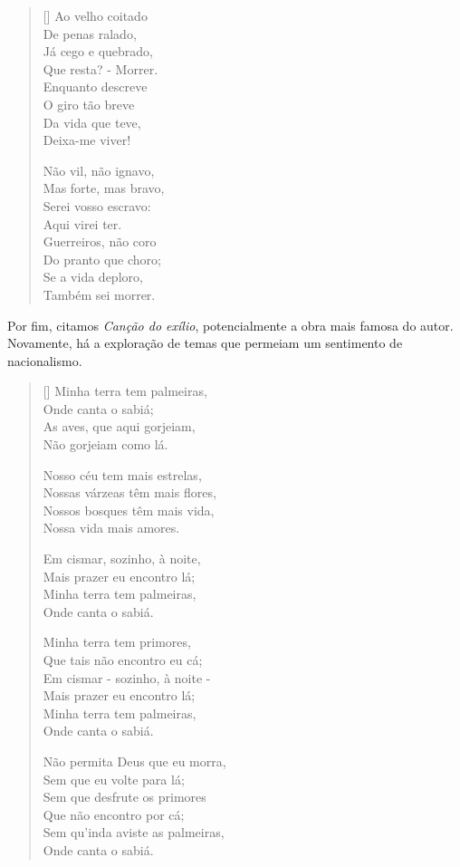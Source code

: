 \documentclass[12pt]{book}
\begin{document}
\begin{verse}[\versewidth]
						Ao velho coitado \\
						De penas ralado, \\
						Já cego e quebrado, \\
						Que resta? - Morrer. \\
						Enquanto descreve \\
						O giro tão breve \\
						Da vida que teve, \\
						Deixa-me viver!
						
						Não vil, não ignavo, \\
						Mas forte, mas bravo, \\
						Serei vosso escravo: \\
						Aqui virei ter. \\
						Guerreiros, não coro \\
						Do pranto que choro; \\
						Se a vida deploro, \\
						Também sei morrer.
					\end{verse}
				\par Por fim, citamos \textit{Canção do exílio}, potencialmente a obra mais famosa do autor. Novamente, há a exploração de temas que permeiam um sentimento de nacionalismo. 
				\settowidth{\versewidth}{Onde canta o sabiá;}
				\begin{verse}[\versewidth]
					Minha terra tem palmeiras, \\
					Onde canta o sabiá; \\
					As aves, que aqui gorjeiam, \\
					Não gorjeiam como lá.
						
					Nosso céu tem mais estrelas, \\
					Nossas várzeas têm mais flores, \\
					Nossos bosques têm mais vida, \\
					Nossa vida mais amores.
					
					Em cismar, sozinho, à noite, \\
					Mais prazer eu encontro lá; \\
					Minha terra tem palmeiras, \\
					Onde canta o sabiá.
					
					Minha terra tem primores, \\
					Que tais não encontro eu cá; \\
					Em cismar - sozinho, à noite - \\
					Mais prazer eu encontro lá; \\
					Minha terra tem palmeiras, \\
					Onde canta o sabiá.
					
					Não permita Deus que eu morra, \\
					Sem que eu volte para lá; \\
					Sem que desfrute os primores \\
					Que não encontro por cá; \\
					Sem qu'inda aviste as palmeiras, \\
					Onde canta o sabiá.
					\end{verse}
\end{document}
